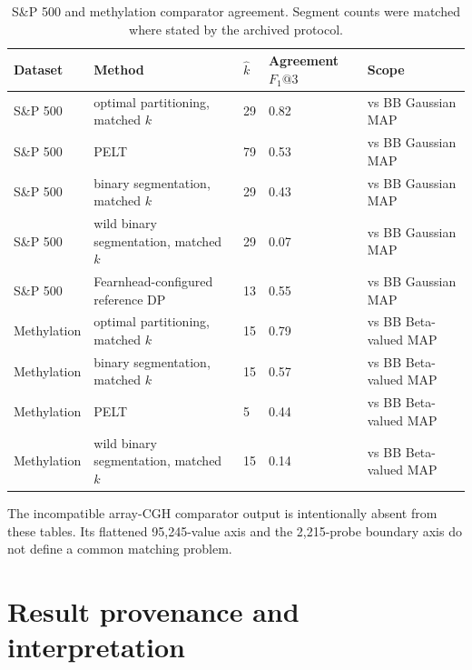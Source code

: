 \begin{table}[H]
\centering
\small
\caption{S\&P 500 and methylation comparator agreement. Segment counts were matched where stated by the archived protocol.}
\label{tab:spx-methyl-agreement-app}
\begin{tabularx}{0.96\textwidth}{@{}L{0.20\textwidth}L{0.28\textwidth}R{0.11\textwidth}R{0.13\textwidth}Y@{}}
\toprule
Dataset & Method & $\widehat k$ & Agreement $F_1@3$ & Scope \\
\midrule
S\&P 500 & optimal partitioning, matched $k$ & 29 & 0.82 & vs BB Gaussian MAP \\
S\&P 500 & PELT & 79 & 0.53 & vs BB Gaussian MAP \\
S\&P 500 & binary segmentation, matched $k$ & 29 & 0.43 & vs BB Gaussian MAP \\
S\&P 500 & wild binary segmentation, matched $k$ & 29 & 0.07 & vs BB Gaussian MAP \\
S\&P 500 & Fearnhead-configured reference DP & 13 & 0.55 & vs BB Gaussian MAP \\
Methylation & optimal partitioning, matched $k$ & 15 & 0.79 & vs BB Beta-valued MAP \\
Methylation & binary segmentation, matched $k$ & 15 & 0.57 & vs BB Beta-valued MAP \\
Methylation & PELT & 5 & 0.44 & vs BB Beta-valued MAP \\
Methylation & wild binary segmentation, matched $k$ & 15 & 0.14 & vs BB Beta-valued MAP \\
\bottomrule
\end{tabularx}
\end{table}

The incompatible array-CGH comparator output is intentionally absent from these tables. Its flattened 95,245-value axis and the 2,215-probe boundary axis do not define a common matching problem.

\section{Result provenance and interpretation}
\label{app:provenance}

